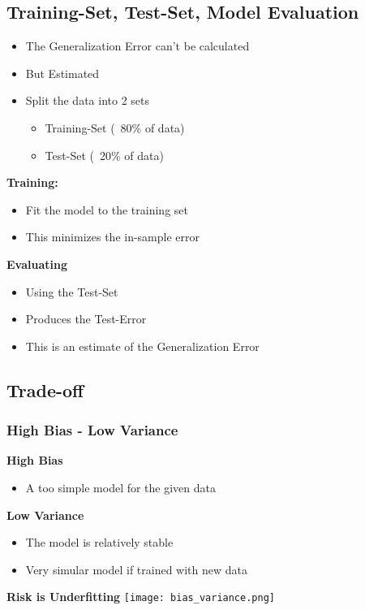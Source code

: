 \subsection{Training-Set, Test-Set, Model Evaluation}
\begin{itemize}
    \item The Generalization Error can't be calculated
    \item But Estimated
    \item Split the data into 2 sets
          \begin{itemize}
              \item Training-Set (~80\% of data)
              \item Test-Set (~20\% of data)
          \end{itemize}
\end{itemize}
\textbf{Training:}
\begin{itemize}
    \item Fit the model to the training set
    \item This minimizes the in-sample error
\end{itemize}
\textbf{Evaluating}
\begin{itemize}
    \item Using the Test-Set
    \item Produces the Test-Error
    \item This is an estimate of the Generalization Error
\end{itemize}
\subsection{Trade-off}
\subsubsection{High Bias - Low Variance}
\textbf{High Bias}
\begin{itemize}
    \item A too simple model for the given data
\end{itemize}
\textbf{Low Variance}
\begin{itemize}
    \item The model is relatively stable
    \item Very simular model if trained with new data
\end{itemize}
\textbf{Risk is Underfitting}
\texttt{[image: bias\_variance.png]}
